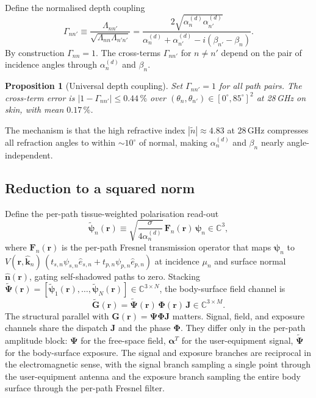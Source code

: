 \documentclass[journal,twocolumn,10pt]{IEEEtran}
\theoremstyle{plain}
\newtheorem{proposition}[theorem]{Proposition}
\theoremstyle{remark}
\newcommand{\khat}{\hat{\bm{k}}}
\newcommand{\nhat}{\hat{\bm{n}}}
\newcommand{\rr}{\mathbf{r}}
\newcommand{\GG}{\mathbf{G}}
\newcommand{\Gtil}{\tilde{\mathbf{G}}}
\newcommand{\Jmat}{\mathbf{J}}
\newcommand{\Phimat}{\mathbf{\Phi}}
\newcommand{\Psimat}{\bm{\Psi}}
\newcommand{\Psitil}{\tilde{\bm{\Psi}}}
\newcommand{\Fn}{\mathbf{F}_n}
\newcommand{\psin}{\bm{\psi}_n}
\newcommand{\Complex}{\mathbb{C}}
\newcommand{\ntilde}{\tilde{n}}
\newcommand{\Vis}{V}
\begin{document}
Define the normalised depth coupling
\begin{equation}\label{eq:Gamma-def}
  \Gamma_{nn'} \equiv \frac{\Lambda_{nn'}}{\sqrt{\Lambda_{nn} \Lambda_{n'n'}}}
  = \frac{2 \sqrt{\alpha_n^{(d)} \alpha_{n'}^{(d)}}}
  {\alpha_n^{(d)} + \alpha_{n'}^{(d)} - i(\beta_{n'} - \beta_n)}.
\end{equation}
By construction $\Gamma_{nn} = 1$. The cross-terms $\Gamma_{nn'}$
for $n \neq n'$ depend on the pair of incidence angles through
$\alpha_n^{(d)}$ and $\beta_n$.

\begin{proposition}[Universal depth coupling]\label{prop:approx2}
Set $\Gamma_{nn'} = 1$ for all path pairs. The cross-term error is
$|1 - \Gamma_{nn'}| \leq 0.44\,\%$ over
$(\theta_n, \theta_{n'}) \in [0^\circ, 85^\circ]^2$ at 28\,GHz on
skin, with mean $0.17\,\%$.
\end{proposition}

The mechanism is that the high refractive index $|\ntilde| \approx
4.83$ at 28\,GHz compresses all refraction angles to within
$\sim 10^\circ$ of normal, making $\alpha_n^{(d)}$ and $\beta_n$
nearly angle-independent.

\subsection{Reduction to a squared norm}

Define the per-path tissue-weighted polarisation read-out
\begin{equation}\label{eq:psi-tilde}
  \tilde{\bm{\psi}}_n(\rr) \equiv \sqrt{\frac{\sigma}{4\alpha_n^{(d)}}}\,
  \Fn(\rr)\,\psin \in \Complex^3,
\end{equation}
where $\Fn(\rr)$ is the per-path Fresnel transmission operator
that maps $\psin$ to $\Vis(\rr,\khat_n)\,(t_{s,n} \psi_{s,n} \hat{e}_{s,n} +
t_{p,n} \psi_{p,n} \hat{e}_{p,n})$ at incidence $\mu_n$ and surface
normal $\nhat(\rr)$, gating self-shadowed paths to zero. Stacking
$\Psitil(\rr) = [\tilde{\bm{\psi}}_1(\rr), \ldots,
\tilde{\bm{\psi}}_N(\rr)] \in \Complex^{3 \times N}$, the
body-surface field channel is
\begin{equation}\label{eq:Gtilde-decomp}
  \Gtil(\rr) = \Psitil(\rr)\,\Phimat(\rr)\,\Jmat \in \Complex^{3 \times M}.
\end{equation}
The structural parallel with $\GG(\rr) = \Psimat \Phimat \Jmat$
matters. Signal, field, and exposure channels share the dispatch
$\Jmat$ and the phase $\Phimat$. They differ only in the per-path
amplitude block: $\Psimat$ for the free-space field, $\bm\alpha^T$
for the user-equipment signal, $\Psitil$ for the body-surface
exposure. The signal and exposure branches are reciprocal in the
electromagnetic sense, with the signal branch sampling a single
point through the user-equipment antenna and the exposure branch
sampling the entire body surface through the per-path Fresnel
filter.
\end{document}
